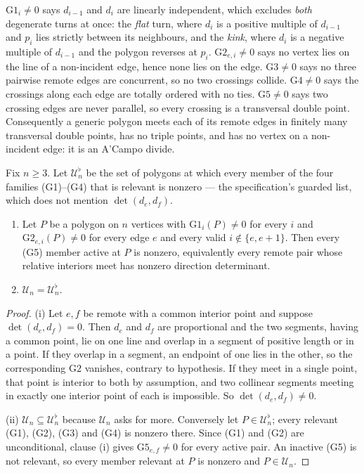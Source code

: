 \begin{remark}\label{rem:genericmeans}
$\mathrm{G1}_i\neq0$ says $d_{i-1}$ and $d_i$ are linearly independent, which
excludes \emph{both} degenerate turns at once: the \emph{flat} turn, where
$d_i$ is a positive multiple of $d_{i-1}$ and $p_i$ lies strictly between its
neighbours, and the \emph{kink}, where $d_i$ is a negative multiple of $d_{i-1}$
and the polygon reverses at $p_i$. $\mathrm{G2}_{e,i}\neq0$ says no vertex lies
on the line of a non-incident edge, hence none lies on the edge.
$\mathrm{G3}\neq0$ says no three pairwise remote edges are concurrent, so no two
crossings collide. $\mathrm{G4}\neq0$ says the crossings along each edge are
totally ordered with no ties. $\mathrm{G5}\neq0$ says two crossing edges are
never parallel, so every crossing is a transversal double point. Consequently a
generic polygon meets each of its remote edges in finitely many transversal
double points, has no triple points, and has no vertex on a non-incident edge:
it is an A'Campo divide.
\end{remark}

\begin{proposition}\label{prop:fidelity}
Fix $n\geq3$. Let $\mathcal U_n^{\flat}$ be the set of polygons at which every member of the
four families (G1)--(G4) that is relevant is nonzero --- the specification's
guarded list, which does not mention $\det(d_e,d_f)$.
\begin{enumerate}
\item[(i)] Let $P$ be a polygon on $n$ vertices with $\mathrm{G1}_i(P)\neq0$ for every $i$ and
$\mathrm{G2}_{e,i}(P)\neq0$ for every edge $e$ and every valid
$i\notin\{e,e+1\}$. Then every (G5) member active at $P$ is nonzero,
equivalently every remote pair whose relative interiors meet has nonzero direction determinant.
\item[(ii)] $\mathcal U_n=\mathcal U_n^{\flat}$.
\end{enumerate}
\end{proposition}
\begin{proof}
(i) Let $e,f$ be remote with a common interior point and suppose
$\det(d_e,d_f)=0$. Then $d_e$ and $d_f$ are proportional and the two segments,
having a common point, lie on one line and overlap in a segment of positive
length or in a point. If they overlap in a segment, an endpoint of one lies in
the other, so the corresponding $\mathrm{G2}$ vanishes, contrary to hypothesis.
If they meet in a single point, that point is interior to both by assumption,
and two collinear segments meeting in exactly one interior point of each is
impossible. So $\det(d_e,d_f)\neq0$.

(ii) $\mathcal U_n\subseteq\mathcal U_n^{\flat}$ because $\mathcal U_n$ asks for more.
Conversely let $P\in\mathcal U_n^{\flat}$; every relevant (G1), (G2), (G3) and
(G4) is nonzero there. Since (G1) and (G2) are unconditional, clause (i) gives
$\mathrm{G5}_{e,f}\neq0$ for every active pair. An inactive (G5) is not
relevant, so every member relevant at $P$ is nonzero and $P\in\mathcal U_n$.
\end{proof}

